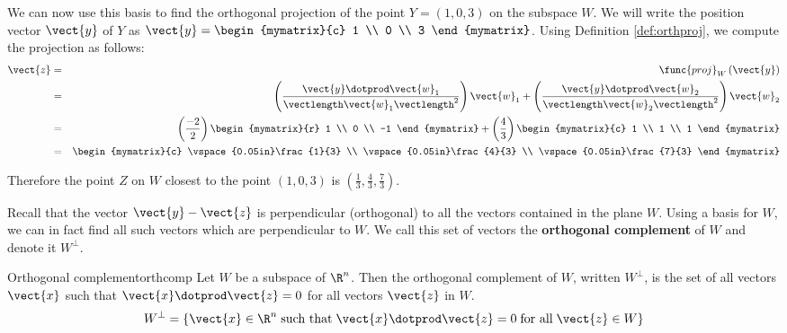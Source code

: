 \begin{solution}
We can now use this basis to find the orthogonal projection of the
point $Y=(1,0,3)$ on the subspace $W$. We will write the position
vector $\vect{y}$ of $Y$ as $\vect{y} = \begin{mymatrix}{c} 1 \\ 0 \\ 3
\end{mymatrix}$. Using Definition \ref{def:orthproj}, we compute the projection as follows:
\begin{eqnarray*}
\vect{z} &=& \func{proj}_{W}\left( \vect{y}\right)\\
&=&
\left( \frac{\vect{y} \dotprod \vect{w}_1}{ \vectlength \vect{w}_1 \vectlength^2}\right) \vect{w}_1
+
\left( \frac{\vect{y} \dotprod \vect{w}_2}{ \vectlength \vect{w}_2 \vectlength^2}\right) \vect{w}_2 \\
&=&
\left( \frac{-2}{2} \right) \begin{mymatrix}{r}
1 \\
0 \\
-1
\end{mymatrix}
+
\left( \frac{4}{3} \right)
\begin{mymatrix}{c}
1 \\
1 \\
1 
\end{mymatrix} \\
&=& 
\begin{mymatrix}{c}
\vspace{0.05in}\frac{1}{3} \\
\vspace{0.05in}\frac{4}{3} \\
\vspace{0.05in}\frac{7}{3} 
\end{mymatrix}
\end{eqnarray*}

Therefore the point $Z$ on $W$ closest to the point $(1,0,3)$  is $\left( \frac{1}{3}, \frac{4}{3}, \frac{7}{3} \right)$. 

\end{solution}

Recall that the vector $\vect{y} - \vect{z}$ is perpendicular
(orthogonal) to all the vectors contained in the plane $W$. Using a
basis for $W$, we can in fact find all such vectors which are
perpendicular to $W$. We call this set of vectors the
\textbf{orthogonal complement} of $W$ and
denote it $W^{\perp}$.

\begin{definition}{Orthogonal complement}{orthcomp}
Let $W$ be a subspace of $\R^n$. Then the orthogonal
complement of $W$, written $W^{\perp}$, is the set of all vectors
$\vect{x}$ such that $\vect{x} \dotprod \vect{z} = 0$ for all vectors
$\vect{z}$ in $W$.
\[
W^{\perp} = \{ \vect{x} \in \R^n \; \mbox{such that} \;
\vect{x} \dotprod \vect{z} = 0 \; \mbox{for all} \; \vect{z} \in W \}
\]
\end{definition}

